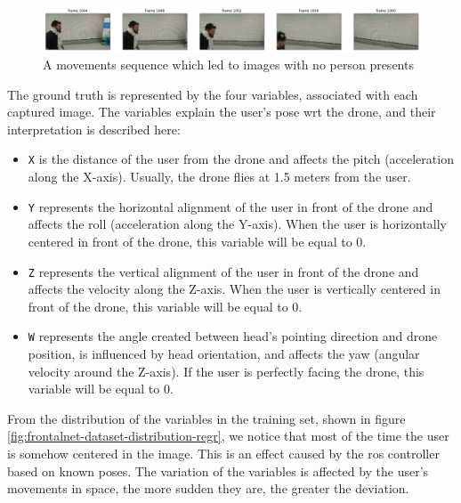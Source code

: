 \begin{figure}[!htb]
\centering
\includegraphics[width=1\textwidth]{"contents/images/03-data-missing"}
\caption[A movements sequence which led to images with no person presents]{A movements sequence which led to images with no person presents}
\label{fig:frontalnet-dataset-missing}
\end{figure}

The ground truth is represented by the four variables, associated with each captured image. The variables explain the user's pose \gls{wrt} the drone, and their interpretation is described here:

\begin{itemize}
	\item \texttt{X} is the distance of the user from the drone and affects the pitch (acceleration along the X-axis). Usually, the drone flies at 1.5 meters from the user.
	\item \texttt{Y} represents the horizontal alignment of the user in front of the drone and affects the roll (acceleration along the Y-axis). When the user is horizontally centered in front of the drone, this variable will be equal to 0.
	\item \texttt{Z} represents the vertical alignment of the user in front of the drone and affects the velocity along the Z-axis. When the user is vertically centered in front of the drone, this variable will be equal to 0.
	\item \texttt{W} represents the angle created between head's pointing direction and drone position, is influenced by head orientation, and affects the yaw (angular velocity around the Z-axis). If the user is perfectly facing the drone, this variable will be equal to 0.
\end{itemize}

From the distribution of the variables in the training set, shown in figure \ref{fig:frontalnet-dataset-distribution-regr}, we notice that most of the time the user is somehow centered in the image. This is an effect caused by the \gls{ros} controller based on known poses. The variation of the variables is affected by the user's movements in space, the more sudden they are, the greater the deviation.

